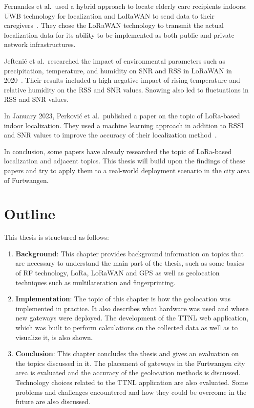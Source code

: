 Fernandes et al.\ used a hybrid approach to locate elderly care recipients indoors: \ac{UWB} technology for localization and \ac{LoRaWAN} to send data to their caregivers~\cite{fernandes_hybrid_2020}.
They chose the \ac{LoRaWAN} technology to transmit the actual localization data for its ability to be implemented as both public and private network infrastructures.

Jeftenić et al.\ researched the impact of environmental parameters such as precipitation, temperature, and humidity on \ac{SNR} and \ac{RSS} in \ac{LoRaWAN} in 2020~\cite{jeftenic_impact_2020}.
Their results included a high negative impact of rising temperature and relative humidity on the \ac{RSS} and \ac{SNR} values.
Snowing also led to fluctuations in \ac{RSS} and \ac{SNR} values.

In January 2023, Perković et al.\ published a paper on the topic of \ac{LoRa}-based indoor localization.
They used a machine learning approach in addition to \ac{RSSI} and \ac{SNR} values to improve the accuracy of their localization method~\cite{perkovic_machine_2023}.

In conclusion, some papers have already researched the topic of \ac{LoRa}-based localization and adjacent topics.
This thesis will build upon the findings of these papers and try to apply them to a real-world deployment scenario in the city area of Furtwangen.

\section{Outline}

This thesis is structured as follows:

\begin{enumerate}
      \item \textbf{Background}:
            This chapter provides background information on topics that are necessary to understand the main part of the thesis, such as some basics of \ac{RF} technology, \ac{LoRa}, \ac{LoRaWAN} and \ac{GPS} as well as geolocation techniques such as multilateration and fingerprinting.
      \item \textbf{Implementation}:
            The topic of this chapter is how the geolocation was implemented in practice.
            It also describes what hardware was used and where new gateways were deployed.
            The development of the \ac{TTNL} web application, which was built to perform calculations on the collected data as well as to visualize it, is also shown.
      \item \textbf{Conclusion}:
            This chapter concludes the thesis and gives an evaluation on the topics discussed in it.
            The placement of gateways in the Furtwangen city area is evaluated and the accuracy of the geolocation methods is discussed.
            Technology choices related to the \ac{TTNL} application are also evaluated.
            Some problems and challenges encountered and how they could be overcome in the future are also discussed.
\end{enumerate}

